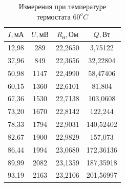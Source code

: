     \begin{table}[!ht]
        \begin{minipage}{.42\linewidth}
            \centering
            \begin{tabular}{|c|c|c|c|}
                \hline

                $I, \text{мА}$ & $U, \text{мВ}$ &  $R_\text{н}, \text{Ом}$ & $Q, \text{Вт}$\\ \hline
                12,98	& 289	& 22,2650	& 3,75122 \\ \hline
                37,96	& 849	& 22,3656	& 32,22804 \\ \hline
                50,98	& 1147	& 22,4990	& 58,47406 \\ \hline
                60,15	& 1360	& 22,6101	& 81,804 \\ \hline
                67,36	& 1530	& 22,7138	& 103,0608 \\ \hline
                73,20	& 1670	& 22,8142	& 122,244 \\ \hline
                78,33	& 1794	& 22,9031	& 140,52402 \\ \hline
                82,67	& 1900	& 22,9829	& 157,073 \\ \hline
                86,44	& 1994	& 23,0680	& 172,36136 \\ \hline
                89,99	& 2082	& 23,1359	& 187,35918 \\ \hline
                93,19	& 2163	& 23,2106	& 201,56997 \\ \hline

            \end{tabular}
            \caption{Измерения при температуре термостата $60^oC$}
            \label{table_80}
        \end{minipage}
    \end{table}

